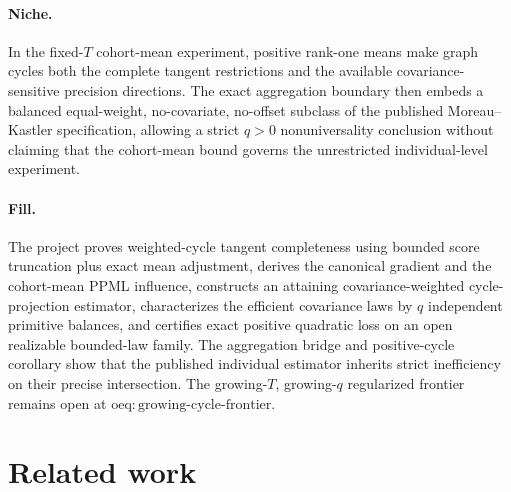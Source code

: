 \documentclass{article}
\begin{document}
\paragraph{Niche.} In the fixed-\(T\) cohort-mean experiment, positive rank-one means make graph cycles both the complete tangent restrictions and the available covariance-sensitive precision directions. The exact aggregation boundary then embeds a balanced equal-weight, no-covariate, no-offset subclass of the published Moreau--Kastler specification, allowing a strict \(q>0\) nonuniversality conclusion without claiming that the cohort-mean bound governs the unrestricted individual-level experiment.

\paragraph{Fill.} The project proves weighted-cycle tangent completeness using bounded score truncation plus exact mean adjustment, derives the canonical gradient and the cohort-mean PPML influence, constructs an attaining covariance-weighted cycle-projection estimator, characterizes the efficient covariance laws by \(q\) independent primitive balances, and certifies exact positive quadratic loss on an open realizable bounded-law family. The aggregation bridge and positive-cycle corollary show that the published individual estimator inherits strict inefficiency on their precise intersection. The growing-\(T\), growing-\(q\) regularized frontier remains open at \(\mathrm{oeq{:}growing\text{-}cycle\text{-}frontier}\).

\section{Related work}
\end{document}
